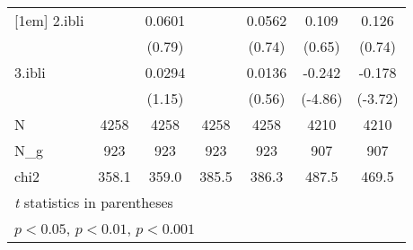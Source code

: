 {\begin{tabular}{l*{6}{c}}
[1em]
2.ibli      &                     &      0.0601         &                     &      0.0562         &       0.109         &       0.126         \\
            &                     &      (0.79)         &                     &      (0.74)         &      (0.65)         &      (0.74)         \\
[1em]
3.ibli      &                     &      0.0294         &                     &      0.0136         &      -0.242\sym{***}&      -0.178\sym{***}\\
            &                     &      (1.15)         &                     &      (0.56)         &     (-4.86)         &     (-3.72)         \\
\hline
N           &        4258         &        4258         &        4258         &        4258         &        4210         &        4210         \\
N\_g         &         923         &         923         &         923         &         923         &         907         &         907         \\
chi2        &       358.1         &       359.0         &       385.5         &       386.3         &       487.5         &       469.5         \\
\hline\hline
\multicolumn{7}{l}{\footnotesize \textit{t} statistics in parentheses}\\
\multicolumn{7}{l}{\footnotesize \sym{*} \(p<0.05\), \sym{**} \(p<0.01\), \sym{***} \(p<0.001\)}\\
\end{tabular}
}
